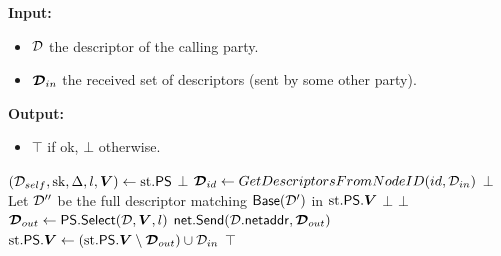 \begin{algorithm}[H]
\caption{\psrecv}
\label{alg:psrecv}
\textbf{Input:}
\begin{itemize}
\vspace{-.8em}
\itemsep0em 
    \item $\mathcal{D}$ the descriptor of the calling party.
    \item $\boldsymbol{\mathcal{D}}_{in}$ the received set of descriptors (sent by some other party).\end{itemize}
\textbf{Output:}
\begin{itemize}
\vspace{-.8em}
\itemsep0em 
    \item $\top$ if ok, $\bot$ otherwise.
\end{itemize}
\begin{algorithmic}
\State $(\mathcal{D}_{self},\text{sk},\Delta,l,\boldsymbol{V}) \gets \text{st}.\mathsf{PS}$
\State {}
\State \Return $\bot$
\EndIf\State {}
\State $\boldsymbol{\mathcal{D}}_{id} \gets GetDescriptorsFromNodeID(id,\mathcal{D}_{in})$
\State \Return $\bot$
\EndIf
\EndFor
\State {}
 
\State Let $\mathcal{D}''$ be the full descriptor matching $\mathsf{Base}(\mathcal{D}')$ in $\text{st}.\mathsf{PS}.\boldsymbol{V}$
\State \Return $\bot$
\EndIf
\EndIf
{}
\State \return $\bot$
\EndIf
\EndFor
\State $\boldsymbol{\mathcal{D}}_{out} \gets \mathsf{PS}.\mathsf{Select}(\mathcal{D},\boldsymbol{V},l)$ 
\State $\mathsf{net}.\mathsf{Send}(\mathcal{D}.\mathsf{netaddr},\boldsymbol{\mathcal{D}}_{out})$
\State $\text{st}.\mathsf{PS}.\boldsymbol{V} \gets (\text{st}.\mathsf{PS}.\boldsymbol{V} \setminus \boldsymbol{\mathcal{D}}_{out}) \cup \mathcal{D}_{in}$ 
\State \Return $\top$
\end{algorithmic}
\end{algorithm}

